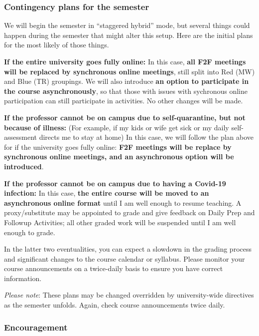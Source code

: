 \documentclass[]{article}
\begin{document}
\hypertarget{contingency-plans-for-the-semester}{%
\subsubsection{Contingency plans for the
semester}\label{contingency-plans-for-the-semester}}

We will begin the semester in ``staggered hybrid'' mode, but several
things could happen during the semester that might alter this setup.
Here are the initial plans for the most likely of those things.

\textbf{If the entire university goes fully online:} In this case,
\textbf{all F2F meetings will be replaced by synchronous online
meetings}, still split into Red (MW) and Blue (TR) groupings. We will
also introduce \textbf{an option to participate in the course
asynchronously}, so that those with issues with sychronous online
participation can still participate in activities. No other changes will
be made.

\textbf{If the professor cannot be on campus due to self-quarantine, but
not because of illness:} (For example, if my kids or wife get sick or my
daily self-assessment directs me to stay at home) In this case, we will
follow the plan above for if the university goes fully online:
\textbf{F2F meetings will be replace by synchronous online meetings, and
an asynchronous option will be introduced}.

\textbf{If the professor cannot be on campus due to having a Covid-19
infection:} In this case, \textbf{the entire course will be moved to an
asynchronous online format} until I am well enough to resume teaching. A
proxy/substitute may be appointed to grade and give feedback on Daily
Prep and Followup Activities; all other graded work will be suspended
until I am well enough to grade.

In the latter two eventualities, you can expect a slowdown in the
grading process and significant changes to the course calendar or
syllabus. Please monitor your course announcements on a twice-daily
basis to ensure you have correct information.

\emph{Please note}: These plans may be changed overridden by
university-wide directives as the semester unfolds. Again, check course
announcements twice daily.

\hypertarget{encouragement}{%
\subsubsection{Encouragement}\label{encouragement}}
\end{document}
